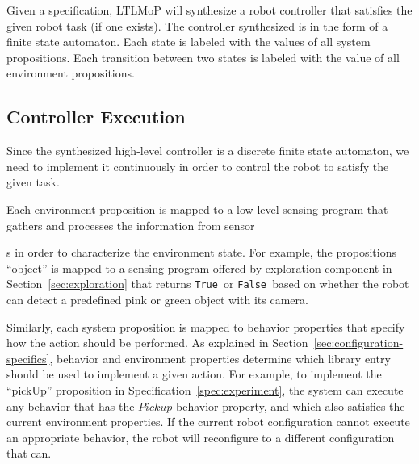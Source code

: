 \documentclass[conference]{IEEEtran}
\newcommand{\lt}{{\tt True }}
\newcommand{\lf}{{\tt False }}
\newcommand{\ltnsp}{{\tt True}}
\begin{document}
Given a specification,  LTLMoP will synthesize a robot controller that satisfies the given robot task (if one exists). The controller synthesized is in the form of a finite state automaton. Each state is labeled with the values of all system propositions. Each transition between two states is labeled with the value of all environment propositions.

\subsection{Controller Execution}
Since the synthesized high-level controller is a discrete finite state automaton, we need to implement it continuously in order to control the robot to satisfy the given task. 

Each environment proposition is mapped to a low-level sensing program that gathers and processes the information from sensor

s in order to characterize the environment state. For example, the propositions ``object'' is mapped to a sensing program offered by exploration component in Section~\ref{sec:exploration} that returns \lt or \lf based on whether the robot can detect a predefined pink or green object with its camera.

Similarly, each system proposition is mapped to behavior properties that specify how the action should be performed. As explained in Section~\ref{sec:configuration-specifics}, behavior and environment properties determine which library entry should be used to implement a given action.
For example, to implement the ``pickUp'' proposition in Specification~\ref{spec:experiment}, the system can execute any behavior that has the $Pick up$  behavior property, and which also satisfies the current environment properties.  If the current robot configuration cannot execute an appropriate behavior, the robot will reconfigure to a different configuration that can.   

\end{document}
